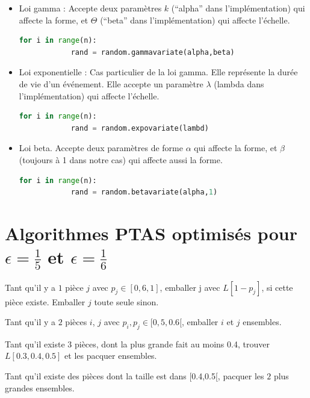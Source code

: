 \documentclass[a4paper,12pt]{report}
\theoremstyle{plain}				%
\theoremstyle{definition}				%
\begin{document}
\begin{appendices}
\begin{itemize}
\item Loi gamma : Accepte deux paramètres $k$ (``alpha'' dans l'implémentation) qui affecte la forme, et $\Theta$ (``beta'' dans l’implémentation) qui affecte l'échelle.  
  \begin{lstlisting}[language=Python]
	for i in range(n):
    		rand = random.gammavariate(alpha,beta)
  \end{lstlisting}
\item Loi exponentielle : Cas particulier de la loi gamma. Elle représente la durée de vie d'un événement. Elle accepte un paramètre $\lambda$ (lambda dans l'implémentation) qui affecte l'échelle.  
  \begin{lstlisting}[language=Python]
	for i in range(n):
    		rand = random.expovariate(lambd)
  \end{lstlisting}

\item Loi beta. Accepte deux paramètres de forme $\alpha$ qui affecte la forme, et $\beta$ (toujours à 1 dans notre cas) qui affecte aussi la forme.
  \begin{lstlisting}[language=Python]
	for i in range(n):
    		rand = random.betavariate(alpha,1)
  \end{lstlisting}

\end{itemize}

\section*{Algorithmes PTAS optimisés pour $\epsilon = \frac{1}{5}$ et $\epsilon = \frac{1}{6}$}
\label{ap:PTAS}

\begin{algorithm}[H]
\DontPrintSemicolon

Tant qu'il y a $1$ pièce $j$ avec $p_j \in [0,6, 1]$, emballer j avec
$L[1 - p_j]$, si cette pièce existe.
Emballer $j$ toute seule sinon.

\BlankLine %
Tant qu'il y a $2$ pièces $i$, $j$ avec $p_i, p_j \in [0,5, 0.6[$,
emballer $i$ et $j$ ensembles.

\BlankLine %
Tant qu'il existe $3$ pièces, dont la plus grande fait au moins 0.4,
trouver $L[0.3,0.4,0.5]$ et les pacquer ensembles.

\BlankLine %
Tant qu'il existe des pièces dont la taille est dans [0.4,0.5[, pacquer
les $2$ plus grandes ensembles.


\end{algorithm}
\end{appendices}
\end{document}
